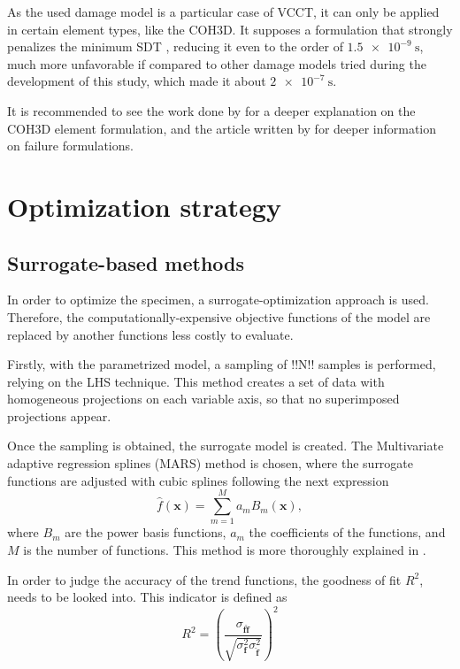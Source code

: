 \documentclass[cmfonts]{witpress}
\begin{document}
As the used damage model is a particular case of VCCT, it can only be applied in certain element types, like the COH3D. It supposes a formulation that strongly penalizes the minimum SDT \cite{Abaqus613Manual}, reducing it even to the order of $\SI{1.5e-9}{\s}$, much more unfavorable if compared to other damage models tried during the development of this study, which made it about $\SI{2e-7}{\s}$.

It is recommended to see the work done by \cite{Alfano2001} for a deeper explanation on the COH3D element formulation, and the article written by \cite{May2014} for deeper information on failure formulations.
\section{Optimization strategy}


\subsection{Surrogate-based methods}

In order to optimize the specimen, a surrogate-optimization approach is used. Therefore, the computationally-expensive  objective functions of the model are replaced by another functions less costly to evaluate. 

Firstly, with the parametrized model, a sampling of !!N!! samples is performed, relying on the LHS technique. This method creates a set of data with homogeneous projections on each variable axis, so that no superimposed projections appear. 

Once the sampling is obtained, the surrogate model is created. The Multivariate adaptive regression splines (MARS) method is chosen, where the surrogate functions are adjusted with cubic splines following the next expression
\begin{equation}\label{eq:mars}
\hat{f}\left ( \bm{x} \right )= \sum_{m=1}^{M}a_{m}B_{m}\left ( \bm{x} \right ),
\end{equation}
where $B_{m}$ are the power basis functions, $a_{m}$ the coefficients of the functions, and $M$ is the number of functions. This method is more thoroughly explained in \cite{Friedman1995197}. 

In order to judge the accuracy of the trend functions, the goodness of fit $R^2$, needs to be looked into. This indicator is defined as
\begin{equation}\label{eq:correlation_coefficient}
  R^2 = {\left(\dfrac{\sigma_{\bm{f}
\bm{\hat{f}}}}{\sqrt{\sigma_{\bm{f}}^2
\sigma_{\bm{\hat{f}}}^2}}\right)}^2
\end{equation}
\end{document}
